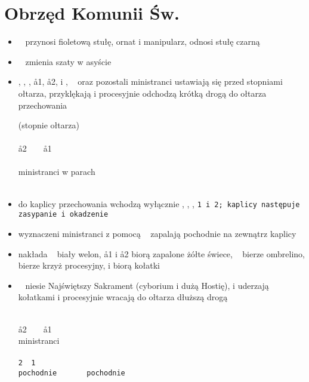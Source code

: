 \section{Obrzęd Komunii Św.}

\begin{itemize}
      \item \zz~ przynosi {\color{violet} fioletową} stułę, ornat i manipularz,
            odnosi stułę czarną
      \item \ii~ zmienia szaty w asyście 
      \item \ii, , , \aa1, \aa2,  i , \oo~ oraz
            pozostali ministranci ustawiają się przed stopniami ołtarza,
            przyklękają i procesyjnie odchodzą krótką drogą do ołtarza
            przechowania

            \newpage

            \begin{center}
                  (stopnie ołtarza) \smallskip\\
                  ~~\ii~~ \smallskip\\
                  \aa2~~~~\aa1 \smallskip\\
                  ~~~~ \smallskip\\
                  ministranci w parach \smallskip\\
                  \oo \smallskip\\
                  \downarrow
            \end{center}

      \item do kaplicy przechowania wchodzą wyłącznie \ii, , , \tt1 i
            \tt2; kaplicy następuje zasypanie i okadzenie
      \item wyznaczeni ministranci z pomocą \zz~ zapalają pochodnie na zewnątrz
            kaplicy
      \item {} nakłada \ii~ biały welon, \aa1 i \aa2 biorą zapalone
                  {\color{orange}żółte} świece, \oo~ bierze ombrelino, 
            bierze krzyż procesyjny,  i  biorą kołatki
      \item \ii~ niesie Najświętszy Sakrament (cyborium i dużą Hostię),  i
             uderzają kołatkami i procesyjnie wracają do ołtarza dłuższą
            drogą

            \begin{center}
                  \uparrow \smallskip\\
                  \aa2~~~~\aa1 \smallskip\\
                  ministranci \smallskip\\
                  ~~ \smallskip\\
                  \tt2~~\tt1 \smallskip\\
                  pochodnie~~~~\ii~~ pochodnie \smallskip\\
                  \oo
            \end{center}


\end{itemize}
